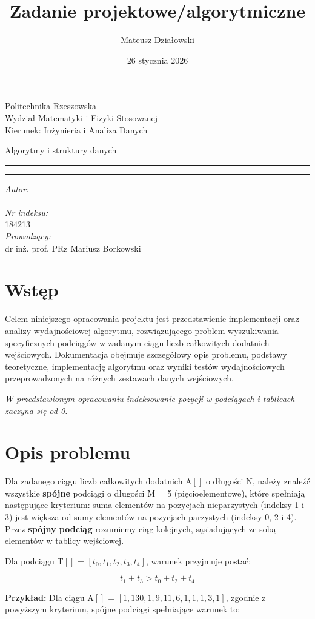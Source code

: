 \documentclass[12pt]{article}
\author{Mateusz Działowski}
\title{Zadanie projektowe/algorytmiczne}
\date{26 stycznia 2026}
\makeatletter
\newcommand{\linia}{\rule{\linewidth}{0.4mm}}
\renewcommand{\maketitle}{\begin{titlepage}
	 	 \vspace*{1cm}
	 	 \begin{center}\small
	 	 Politechnika Rzeszowska\\
	 	 Wydział Matematyki i Fizyki Stosowanej\\
	 	 \vspace{0.3cm}
	 	 Kierunek: Inżynieria i Analiza Danych
	 	 \end{center}
	 	 \vspace{2.5cm}
	 	 \begin{center}
	 	 	\scalebox{4}{Sprawozdanie}
            \begin{center}\Large
                Algorytmy i struktury danych\\[0.3cm]
            \end{center}
	 	 \end{center}
	 	 \noindent\linia
	 	 \begin{center}
	 	 	 \LARGE \textsc{\@title}
	 	 \end{center}
	 	 \linia
	 	 \vspace{1.5cm}
	 	 \begin{flushleft}
	 	 \begin{minipage}{7cm}
	 	 \textit{\small Autor:}\\
	 	 \normalsize \textsc{\@author}\\[0.2cm]
	 	 \textit{\small Nr indeksu:}\\
	 	 \normalsize 184213\\[0.5cm]
	 	 \textit{\small Prowadzący:}\\
	 	 \normalsize dr inż. prof. PRz Mariusz Borkowski
	 	 \end{minipage}
	 	 \end{flushleft}
	 	 \vspace*{\stretch{6}}
	 	 \begin{center}
	 	 \@date
	 	 \end{center}
	 \end{titlepage}
}
\makeatother
\begin{document}
\maketitle

\newpage
\tableofcontents
\renewcommand{\figurename}{Rys.} 
\newpage
\section{Wstęp}
Celem niniejszego opracowania projektu jest przedstawienie implementacji oraz analizy wydajnościowej algorytmu, rozwiązującego problem wyszukiwania specyficznych podciągów w zadanym ciągu liczb całkowitych dodatnich wejściowych. Dokumentacja obejmuje szczegółowy opis problemu, podstawy teoretyczne, implementację algorytmu oraz wyniki testów wydajnościowych przeprowadzonych na różnych zestawach danych wejściowych.

\vspace{0.4cm}

\textit{W przedstawionym opracowaniu indeksowanie pozycji w podciągach i tablicach zaczyna się od 0.}

\vspace{0.4cm}

\newpage
\section{Opis problemu}

Dla zadanego ciągu liczb całkowitych dodatnich A$[]$ o długości N, należy znaleźć wszystkie \textbf{spójne} podciągi o długości M = 5 (pięcioelementowe), które spełniają następujące kryterium: suma elementów na pozycjach nieparzystych (indeksy 1 i 3) jest większa od sumy elementów na pozycjach parzystych (indeksy 0, 2 i 4).
Przez \textbf{spójny podciąg} rozumiemy ciąg kolejnych, sąsiadujących ze sobą elementów w tablicy wejściowej.

\vspace{0.4cm}

Dla podciągu T$[]$ = $[t_0,t_1,t_2,t_3,t_4]$, warunek przyjmuje postać:

\vspace{0.4cm}

\begin{equation}
    t_1 + t_3 > t_0 + t_2 + t_4
\end{equation}

\vspace{0.4cm}

{\bfseries Przykład:} Dla ciągu A$[]$ = $[1, 130, 1, 9, 11, 6, 1, 1, 1, 3, 1]$, zgodnie z powyższym kryterium, spójne podciągi spełniające warunek to:
\end{document}
